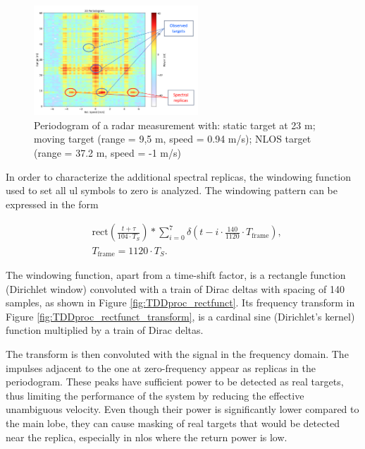    \begin{figure}[H]
        \centering
        \includegraphics[width=0.55\textwidth]{Images/TDDprocessing/SpectralReplicasDLULpattern.png}
        \caption{Periodogram of a radar measurement with: static target at 23 m; moving target (range = 9,5 m, speed = 0.94 m/s); NLOS target (range = 37.2 m, speed = -1 m/s)}
        \label{fig:SpectralReplicasDLULpattern}
    \end{figure}
    
    In order to characterize the additional spectral replicas, the windowing function used to set all \gls{ul} symbols to zero is analyzed. The windowing pattern can be expressed in the form
    
    \begin{align}
        &\text{rect}\left( \frac{t + \tau}{104 \cdot T_S}\right) \ast \sum_{i=0}^7 \delta\left( t - i\cdot \frac{140}{1120}\cdot T_{\text{frame}} \right),  \\
        &T_{\text{frame}} = 1120 \cdot T_S.
    \end{align}

    The windowing function, apart from a time-shift factor, is a rectangle function (Dirichlet window) convoluted with a train of Dirac deltas with spacing of 140 samples, as shown in Figure \ref{fig:TDDproc_rectfunct}. Its frequency transform in Figure \ref{fig:TDDproc_rectfunct_transform}, is a cardinal sine (Dirichlet's kernel) function multiplied by a train of Dirac deltas.

    The transform is then convoluted with the signal in the frequency domain. The impulses adjacent to the one at zero-frequency appear as replicas in the periodogram. These peaks have sufficient power to be detected as real targets, thus limiting the performance of the system by reducing the effective unambiguous velocity. Even though their power is significantly lower compared to the main lobe, they can cause masking of real targets that would be detected near the replica, especially in \gls{nlos} where the return power is low. 

